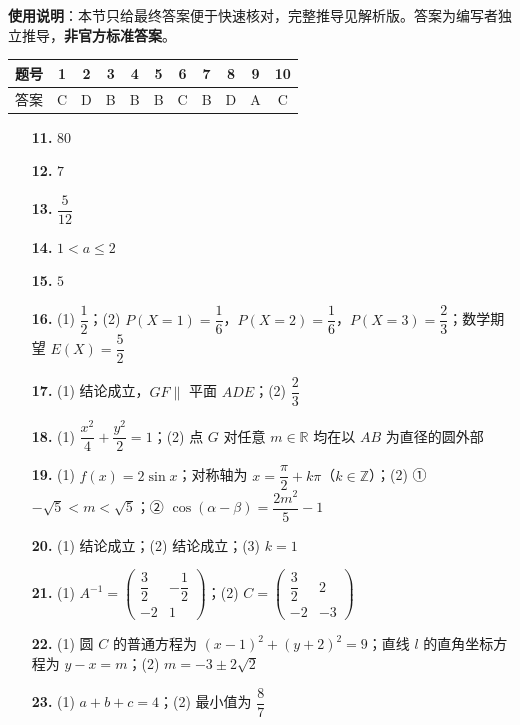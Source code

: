 
\begin{gknotice}
\textbf{使用说明}：本节只给最终答案便于快速核对，完整推导见解析版。答案为编写者独立推导，\textbf{非官方标准答案}。
\end{gknotice}

\begin{center}\begin{tabular}{ccccccccccc}
\toprule
题号 & 1 & 2 & 3 & 4 & 5 & 6 & 7 & 8 & 9 & 10 \\
\midrule
答案 & C & D & B & B & B & C & B & D & A & C \\
\bottomrule
\end{tabular}\end{center}

\begin{itemize}[leftmargin=2.6em]
  \item[\textbf{11.}] $80$
  \item[\textbf{12.}] $7$
  \item[\textbf{13.}] $\dfrac5{12}$
  \item[\textbf{14.}] $1<a\leqslant2$
  \item[\textbf{15.}] $5$
\end{itemize}

\begin{itemize}[leftmargin=2.6em]
  \item[\textbf{16.}] (1) $\dfrac12$；(2) $P(X=1)=\dfrac16$，$P(X=2)=\dfrac16$，$P(X=3)=\dfrac23$；数学期望 $E(X)=\dfrac52$
  \item[\textbf{17.}] (1) 结论成立，$GF\parallel$ 平面 $ADE$；(2) $\dfrac23$
  \item[\textbf{18.}] (1) $\dfrac{x^2}{4}+\dfrac{y^2}{2}=1$；(2) 点 $G$ 对任意 $m\in\mathbb{R}$ 均在以 $AB$ 为直径的圆外部
  \item[\textbf{19.}] (1) $f(x)=2\sin x$；对称轴为 $x=\dfrac\pi2+k\pi$（$k\in\mathbb{Z}$）；(2) ① $-\sqrt5<m<\sqrt5$；② $\cos(\alpha-\beta)=\dfrac{2m^2}{5}-1$
  \item[\textbf{20.}] (1) 结论成立；(2) 结论成立；(3) $k=1$
  \item[\textbf{21.}] (1) $A^{-1}=\begin{pmatrix}\dfrac32&-\dfrac12\\-2&1\end{pmatrix}$；(2) $C=\begin{pmatrix}\dfrac32&2\\-2&-3\end{pmatrix}$
  \item[\textbf{22.}] (1) 圆 $C$ 的普通方程为 $(x-1)^2+(y+2)^2=9$；直线 $l$ 的直角坐标方程为 $y-x=m$；(2) $m=-3\pm2\sqrt2$
  \item[\textbf{23.}] (1) $a+b+c=4$；(2) 最小值为 $\dfrac87$
\end{itemize}

